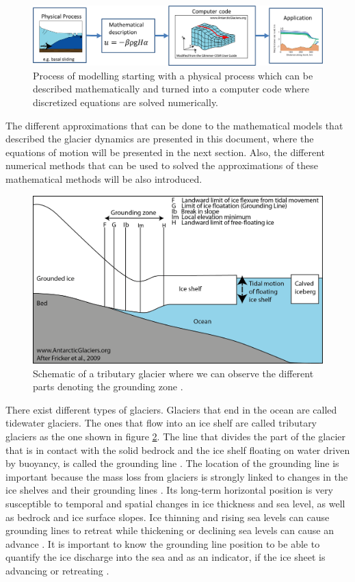 \documentclass{article}
\begin{document}
\begin{figure}[!h]
	\centering
	\includegraphics[width=0.7\linewidth]{../fig/Numerical_modelling_scheme.png}
	\caption{Process of modelling starting with a physical process which can be described mathematically and turned into a computer code where discretized equations are solved numerically.}
	\label{Modelling_process}
\end{figure}

The different approximations that can be done to the mathematical models that described the glacier dynamics are presented in this document, where the equations of motion will be presented in the next section. Also, the different numerical methods that can be used to solved the approximations of these mathematical methods will be also introduced.  

\begin{figure}[!h]
	\centering
	\includegraphics[width=0.7\linewidth]{../fig/groundingzone.png}
	\caption{Schematic of a tributary glacier where we can observe the different parts denoting the grounding zone \cite{fricker2009mapping}.}
	\label{groundingzone}
\end{figure}

There exist different types of glaciers. Glaciers that end in the ocean are called tidewater glaciers. The ones that flow into an ice shelf are called tributary glaciers as the one shown in figure \ref{groundingzone}. The line that divides the part of the glacier that is in contact with the solid bedrock and the ice shelf floating on water driven by buoyancy, is called the grounding line \cite{cheng2019full}. The location of the grounding line is important because the mass loss from glaciers is strongly linked to changes in the ice shelves and their grounding lines \cite{brunt2010mapping,pritchard2012antarctic}. Its long-term horizontal position is very susceptible to temporal and spatial changes in ice thickness and sea level, as well as bedrock and ice surface slopes. Ice thinning and rising sea levels can cause grounding lines to retreat while thickening or declining sea levels can cause an advance \cite{friedl2020remote}. It is important to know the grounding line position to be able to quantify the ice discharge into the sea and as an indicator, if the ice sheet is advancing or retreating \cite{konrad2018net}.
\end{document}
